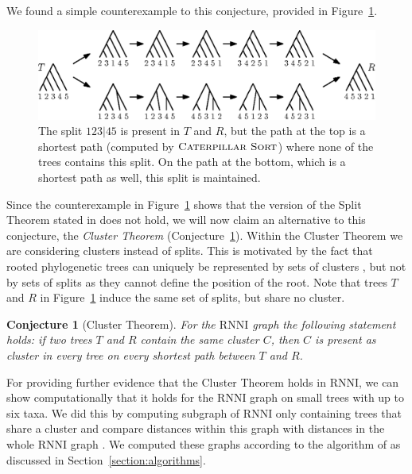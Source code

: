 \documentclass{amsart}
\newcommand{\rnni}{\mathrm{RNNI}}
\newcommand{\csort}{\textsc{Caterpillar Sort}}
\newtheorem{conjecture}[definition]{Conjecture}
\begin{document}
We found a simple counterexample to this conjecture, provided in Figure~\ref{fig:splitthm_counterexample}.

\begin{figure}[H]
\centering
\includegraphics[width=\textwidth]{splitthm_counterexample}
\vspace{12pt}
\caption{The split $123|45$ is present in $T$ and $R$, but the path at the top is a shortest path (computed by $\csort$) where none of the trees contains this split.
On the path at the bottom, which is a shortest path as well, this split is maintained.}
\label{fig:splitthm_counterexample}
\end{figure}

Since the counterexample in Figure~\ref{fig:splitthm_counterexample} shows that the version of the Split Theorem stated in \autocite{Gavryushkin2018-ol} does not hold, we will now claim an alternative to this conjecture, the \emph{Cluster Theorem} (Conjecture~\ref{conjecture:cluster_theorem}).
Within the Cluster Theorem we are considering clusters instead of splits.
This is motivated by the fact that rooted phylogenetic trees can uniquely be represented by sets of clusters \autocite{Steel2016-ye}, but not by sets of splits as they cannot define the position of the root.
Note that trees $T$ and $R$ in Figure~\ref{fig:splitthm_counterexample} induce the same set of splits, but share no cluster.

\begin{conjecture}[Cluster Theorem]
For the $\rnni$ graph the following statement holds:
if two trees $T$ and $R$ contain the same cluster $C$, then $C$ is present as cluster in every tree on every shortest path between $T$ and $R$.
\label{conjecture:cluster_theorem}
\end{conjecture}


For providing further evidence that the Cluster Theorem holds in $\rnni$, we can show computationally that it holds for the $\rnni$ graph on small trees with up to six taxa.
We did this by computing subgraph of $\rnni$ only containing trees that share a cluster and compare distances within this graph with distances in the whole $\rnni$ graph \autocite{}.
We computed these graphs according to the algorithm of \autocite{Gavryushkin2018-ol} as discussed in Section~\ref{section:algorithms}.
\end{document}
